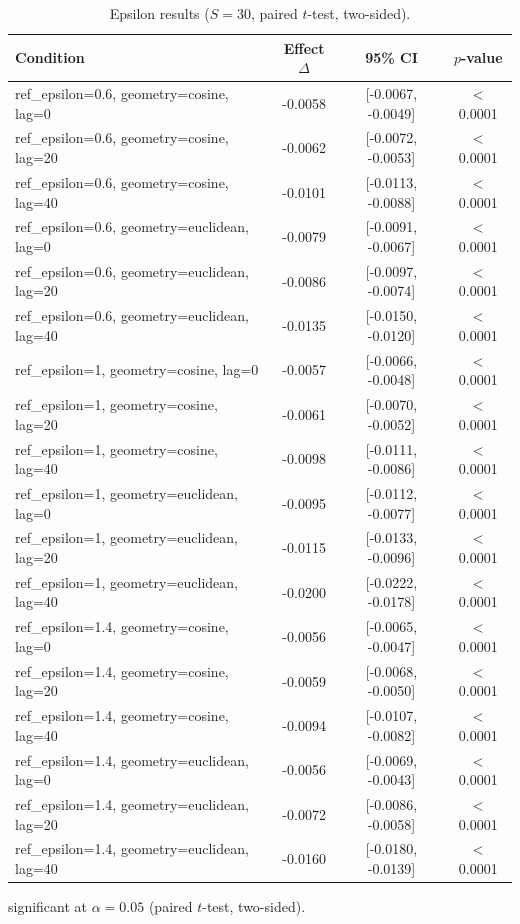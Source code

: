 \begin{table}[t]
  \centering
  \caption{Epsilon results ($S=30$, paired $t$-test, two-sided).}
  \label{tab:epsilon}
  \begin{tabular}{lccc}
    \toprule
    Condition & Effect $\Delta$ & 95\% CI & $p$-value \\
    \midrule
    ref_epsilon=0.6, geometry=cosine, lag=0 & -0.0058\dag{} & [-0.0067, -0.0049] & $<$0.0001 \\
    ref_epsilon=0.6, geometry=cosine, lag=20 & -0.0062\dag{} & [-0.0072, -0.0053] & $<$0.0001 \\
    ref_epsilon=0.6, geometry=cosine, lag=40 & -0.0101\dag{} & [-0.0113, -0.0088] & $<$0.0001 \\
    ref_epsilon=0.6, geometry=euclidean, lag=0 & -0.0079\dag{} & [-0.0091, -0.0067] & $<$0.0001 \\
    ref_epsilon=0.6, geometry=euclidean, lag=20 & -0.0086\dag{} & [-0.0097, -0.0074] & $<$0.0001 \\
    ref_epsilon=0.6, geometry=euclidean, lag=40 & -0.0135\dag{} & [-0.0150, -0.0120] & $<$0.0001 \\
    ref_epsilon=1, geometry=cosine, lag=0 & -0.0057\dag{} & [-0.0066, -0.0048] & $<$0.0001 \\
    ref_epsilon=1, geometry=cosine, lag=20 & -0.0061\dag{} & [-0.0070, -0.0052] & $<$0.0001 \\
    ref_epsilon=1, geometry=cosine, lag=40 & -0.0098\dag{} & [-0.0111, -0.0086] & $<$0.0001 \\
    ref_epsilon=1, geometry=euclidean, lag=0 & -0.0095\dag{} & [-0.0112, -0.0077] & $<$0.0001 \\
    ref_epsilon=1, geometry=euclidean, lag=20 & -0.0115\dag{} & [-0.0133, -0.0096] & $<$0.0001 \\
    ref_epsilon=1, geometry=euclidean, lag=40 & -0.0200\dag{} & [-0.0222, -0.0178] & $<$0.0001 \\
    ref_epsilon=1.4, geometry=cosine, lag=0 & -0.0056\dag{} & [-0.0065, -0.0047] & $<$0.0001 \\
    ref_epsilon=1.4, geometry=cosine, lag=20 & -0.0059\dag{} & [-0.0068, -0.0050] & $<$0.0001 \\
    ref_epsilon=1.4, geometry=cosine, lag=40 & -0.0094\dag{} & [-0.0107, -0.0082] & $<$0.0001 \\
    ref_epsilon=1.4, geometry=euclidean, lag=0 & -0.0056\dag{} & [-0.0069, -0.0043] & $<$0.0001 \\
    ref_epsilon=1.4, geometry=euclidean, lag=20 & -0.0072\dag{} & [-0.0086, -0.0058] & $<$0.0001 \\
    ref_epsilon=1.4, geometry=euclidean, lag=40 & -0.0160\dag{} & [-0.0180, -0.0139] & $<$0.0001 \\
    \bottomrule
  \end{tabular}
  \begin{minipage}{\linewidth}
    \vspace{4pt}
    \footnotesize \dag{} significant at $\alpha = 0.05$ (paired $t$-test, two-sided).
  \end{minipage}
\end{table}